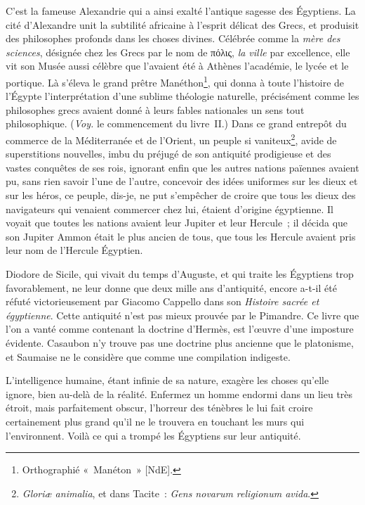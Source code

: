 \documentclass[french,twoside]{book} %
\begin{document}
C’est la fameuse Alexandrie qui a ainsi exalté l’antique sagesse des Égyptiens. La cité d’Alexandre unit la subtilité africaine à l’esprit délicat des Grecs, et produisit des philosophes profonds dans les choses divines. Célébrée comme la {\itshape mère des sciences}, désignée chez les Grecs par le nom de πόλις, {\itshape la ville} par excellence, elle vit son Musée aussi célèbre que l’avaient été à Athènes l’académie, le lycée et le portique. Là s’éleva le grand prêtre Manéthon\footnote{Orthographié « Manéton » [NdE].}, qui donna à toute l’histoire de l’Égypte l’interprétation d’une sublime théologie naturelle, précisément comme les philosophes grecs avaient donné à leurs fables nationales un sens tout philosophique. ({\itshape Voy.} le commencement du livre II.) Dans ce grand entrepôt du commerce de la Méditerranée et de l’Orient, un peuple si vaniteux\footnote{\emph{{\itshape Gloriæ animalia}}, et dans Tacite : \emph{{\itshape Gens novarum religionum avida}}.}, avide de superstitions  nouvelles, imbu du préjugé de son antiquité prodigieuse et des vastes conquêtes de ses rois, ignorant enfin que les autres nations païennes avaient pu, sans rien savoir l’une de l’autre, concevoir des idées uniformes sur les dieux et sur les héros, ce peuple, dis-je, ne put s’empêcher de croire que tous les dieux des navigateurs qui venaient commercer chez lui, étaient d’origine égyptienne. Il voyait que toutes les nations avaient leur Jupiter et leur Hercule ; il décida que son Jupiter Ammon était le plus ancien de tous, que tous les Hercule avaient pris leur nom de l’Hercule Égyptien.\par
Diodore de Sicile, qui vivait du temps d’Auguste, et qui traite les Égyptiens trop favorablement, ne leur donne que deux mille ans d’antiquité, encore a-t-il été réfuté victorieusement par Giacomo Cappello dans son {\itshape Histoire sacrée et égyptienne}. Cette antiquité n’est pas mieux prouvée par le Pimandre. Ce livre que l’on a vanté comme contenant la doctrine d’Hermès, est l’œuvre d’une imposture évidente. Casaubon n’y trouve pas une doctrine plus ancienne que le platonisme, et Saumaise ne le considère que comme une compilation indigeste.\par
L’intelligence humaine, étant infinie de sa nature, exagère les choses qu’elle ignore, bien au-delà de la réalité. Enfermez un homme endormi dans un lieu très étroit, mais parfaitement obscur, l’horreur des ténèbres le lui fait croire certainement plus grand qu’il ne le trouvera en touchant les murs  qui l’environnent. Voilà ce qui a trompé les Égyptiens sur leur antiquité.\par
\end{document}
